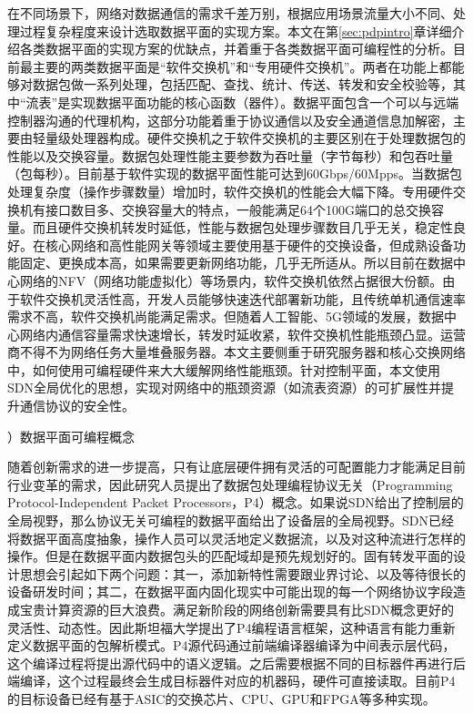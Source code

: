 在不同场景下，网络对数据通信的需求千差万别，根据应用场景流量大小不同、处理过程复杂程度来设计选取数据平面的实现方案。本文在第\ref{sec:pdpintro}章详细介绍各类数据平面的实现方案的优缺点，并着重于各类数据平面可编程性的分析。目前最主要的两类数据平面是“软件交换机”和“专用硬件交换机”。两者在功能上都能够对数据包做一系列处理，包括匹配、查找、统计、传送、转发和安全校验等，其中“流表”是实现数据平面功能的核心函数（器件）。数据平面包含一个可以与远端控制器沟通的代理机构，这部分功能着重于协议通信以及安全通道信息加解密，主要由轻量级处理器构成。硬件交换机之于软件交换机的主要区别在于处理数据包的性能以及交换容量。数据包处理性能主要参数为吞吐量（字节每秒）和包吞吐量（包每秒）。目前基于软件实现的数据平面性能可达到60Gbps/60Mpps。当数据包处理复杂度（操作步骤数量）增加时，软件交换机的性能会大幅下降。专用硬件交换机有接口数目多、交换容量大的特点，一般能满足64个100G端口的总交换容量。而且硬件交换机转发时延低，性能与数据包处理步骤数目几乎无关，稳定性良好。在核心网络和高性能网关等领域主要使用基于硬件的交换设备，但成熟设备功能固定、更换成本高，如果需要更新网络功能，几乎无所适从。所以目前在数据中心网络的NFV（网络功能虚拟化）等场景内，软件交换机依然占据很大份额。由于软件交换机灵活性高，开发人员能够快速迭代部署新功能，且传统单机通信速率需求不高，软件交换机尚能满足需求。但随着人工智能、5G领域的发展，数据中心网络内通信容量需求快速增长，转发时延收紧，软件交换机性能瓶颈凸显。运营商不得不为网络任务大量堆叠服务器。本文主要侧重于研究服务器和核心交换网络中，如何使用可编程硬件来大大缓解网络性能瓶颈。针对控制平面，本文使用SDN全局优化的思想，实现对网络中的瓶颈资源（如流表资源）的可扩展性并提升通信协议的安全性。


{）数据平面可编程概念}

随着创新需求的进一步提高，只有让底层硬件拥有灵活的可配置能力才能满足目前行业变革的需求，因此研究人员提出了数据包处理编程协议无关（Programming Protocol-Independent Packet Processors，P4）概念。如果说SDN给出了控制层的全局视野，那么协议无关可编程的数据平面给出了设备层的全局视野。SDN已经将数据平面高度抽象，操作人员可以灵活地定义数据流，以及对这种流进行怎样的操作。但是在数据平面内数据包头的匹配域却是预先规划好的。固有转发平面的设计思想会引起如下两个问题：其一，添加新特性需要跟业界讨论、以及等待很长的设备研发时间；其二，在数据平面内固化现实中可能出现的每一个网络协议字段造成宝贵计算资源的巨大浪费。满足新阶段的网络创新需要具有比SDN概念更好的灵活性、动态性。因此斯坦福大学提出了P4编程语言框架，这种语言有能力重新定义数据平面的包解析模式。P4源代码通过前端编译器编译为中间表示层代码，这个编译过程将提出源代码中的语义逻辑。之后需要根据不同的目标器件再进行后端编译，这个过程最终会生成目标器件对应的机器码，硬件可直接读取。目前P4的目标设备已经有基于ASIC的交换芯片、CPU、GPU和FPGA等多种实现。

